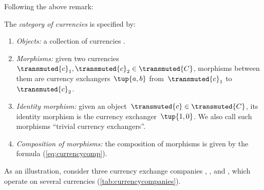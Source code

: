 Following the above remark:

\begin{definition}
  The \emph{category of currencies} \Curr is specified by:
  \begin{enumerate}
    \item \emph{Objects:} a collection of currencies .
    \item \emph{Morphisms:} given two currencies~$\transmuted{c}_1, \transmuted{c}_2\in \transmuted{C}$, morphisms between them are currency exchangers~$\tup{a,b}$ from~$\transmuted{c}_1$ to~$\transmuted{c}_2$.
    \item \emph{Identity morphism:} given an object~$\transmuted{c} \in \transmuted{C}$, its identity morphism is the currency exchanger~$\tup{1,0}$. We also call such morphisms ``trivial currency exchangers''.
    \item \emph{Composition of morphisms:} the composition of morphisms is given by the formula (\cref{eq:currencycomp}).
  \end{enumerate}
\end{definition}



As an illustration, consider three currency exchange companies , , and , which operate on several currencies (\cref{tab:currencycompanies}).

